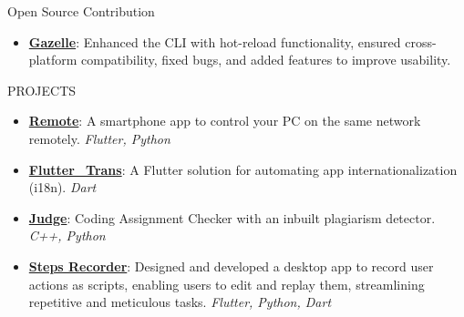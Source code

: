\documentclass{resume} %
\begin{document}
\begin{rSection}{Open Source Contribution}
   \begin{itemize}
      \item     \textbf{\href{https://docs.gazelle-dart.dev/}{Gazelle}}: Enhanced the CLI with hot-reload functionality, ensured cross-platform compatibility, fixed bugs, and added features to improve usability.
   \end{itemize}

\end{rSection}


\begin{rSection}{PROJECTS}
   \begin{itemize}
      \item \textbf{\href{https://github.com/ShivanshuKGupta/remote}{Remote}}: A smartphone app to control your PC on the same network remotely. \hfill \textit{Flutter, Python}
      \item \textbf{\href{https://pub.dev/packages/fluttertrans}{Flutter\_Trans}}: A Flutter solution for automating app internationalization (i18n). \hfill \textit{Dart}
      \item \textbf{\href{https://github.com/ShivanshuKGupta/Judge}{Judge}}: Coding Assignment Checker with an inbuilt plagiarism detector. \hfill \textit{C++, Python}
      \item \textbf{\href{https://github.com/ShivanshuKGupta/Steps-Recorder}{Steps Recorder}}: Designed and developed a desktop app to record user actions as scripts, enabling users to edit and replay them, streamlining repetitive and meticulous tasks. \hfill \textit{Flutter, Python, Dart}
   \end{itemize}
\end{rSection}
\end{document}
